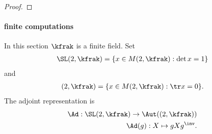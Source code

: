 \begin{proof}
















\end{proof}

\paragraph{finite computations}
In this section $\kfrak$ is a finite field. Set
\begin{align*}
    \SL(2,\kfrak) = \{ x \in M(2,\kfrak) : \det x =1 \}
\end{align*}
and
\begin{align*}
    \sl(2,\kfrak) = \{ x \in M(2,\kfrak) : \tr x = 0 \}.
\end{align*}
The adjoint representation is
\begin{align*}
    \Ad : \SL(2,\kfrak) \to \Aut(\sl(2,\kfrak)) \\
    \Ad(g):  X \mapsto  g X g^\inv.
\end{align*}


\cite{leiningerLengthEigenvalueEquivalence2007}
\cite{voightQuaternionAlgebras2021}
